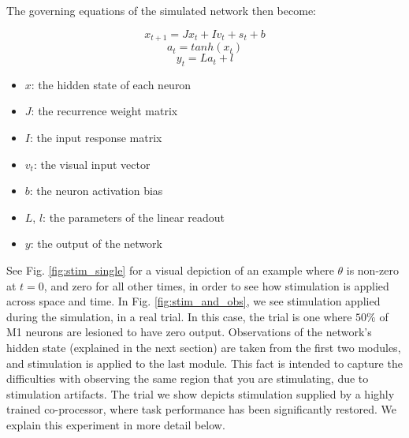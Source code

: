 \documentclass[12pt]{iopart}
\begin{document}
The governing equations of the simulated network then become:

\begin{equation}
x_{t+1} = Jx_{t} + Iv_{t} + s_{t} + b
\end{equation}
\begin{equation}
a_{t} = tanh(x_{t})
\end{equation}
\begin{equation}
y_{t} = La_{t} + l
\end{equation}

\begin{itemize}
	\item $x$: the hidden state of each neuron
	\item $J$: the recurrence weight matrix
	\item $I$: the input response matrix
	\item $v_{t}$: the visual input vector
	\item $b$: the neuron activation bias
	\item $L$, $l$: the parameters of the linear readout
	\item $y$: the output of the network
\end{itemize}

See Fig. \ref{fig:stim_single} for a visual depiction of an example where
$\theta$ is non-zero at $t=0$, and zero for all other times, in order to see how
stimulation is applied across space and time. In Fig. \ref{fig:stim_and_obs},
we see stimulation applied during the simulation, in a real trial. In this case,
the trial is one where $50\%$ of M1 neurons are lesioned to have zero output.
Observations of the network's hidden state (explained in the next section) are taken
from the first two modules, and stimulation is applied to the last module. This fact
is intended to capture the difficulties with observing the same region that you are
stimulating, due to stimulation artifacts. The trial we show depicts stimulation
supplied by a highly trained co-processor, where task performance has been
significantly restored. We explain this experiment in more detail below.
\end{document}
